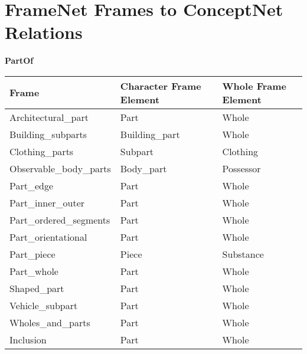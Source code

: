 \section{FrameNet Frames to ConceptNet Relations}
\label{sec:fntocn}
\textbf{PartOf}
\begin{table}[!htbp]
    \begin{tabular}{|l|l|l|}
    \hline
    \textbf{Frame}                 & \textbf{Character Frame Element} & \textbf{Whole Frame Element} \\ \hline
    Architectural\_part   & Part                    & Whole               \\ \hline
    Building\_subparts    & Building\_part          & Whole               \\ \hline
    Clothing\_parts       & Subpart                 & Clothing            \\ \hline
    Observable\_body\_parts & Body\_part              & Possessor           \\ \hline
    Part\_edge            & Part                    & Whole               \\ \hline
    Part\_inner\_outer    & Part                    & Whole               \\ \hline
    Part\_ordered\_segments & Part                    & Whole               \\ \hline
    Part\_orientational   & Part                    & Whole               \\ \hline
    Part\_piece           & Piece                   & Substance           \\ \hline
    Part\_whole           & Part                    & Whole               \\ \hline
    Shaped\_part          & Part                    & Whole               \\ \hline
    Vehicle\_subpart      & Part                    & Whole               \\ \hline
    Wholes\_and\_parts    & Part                    & Whole               \\ \hline
    Inclusion             & Part                    & Whole               \\ \hline
    \end{tabular}
\end{table}

